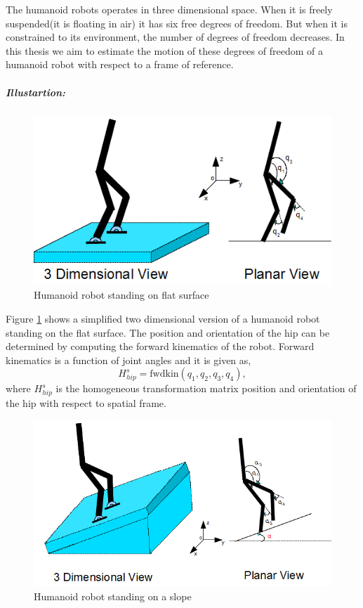    The humanoid robots operates in three dimensional space. When it is freely suspended(it is floating in air) it has six free degrees of freedom. But when it is constrained to its environment, the number of degrees of freedom decreases. In this thesis we aim to estimate the motion of these degrees of freedom of a humanoid robot with respect to a frame of reference.   
\subparagraph{Illustartion:}    
     \begin{figure}[h]
	    \centering
    	\includegraphics[scale=0.75]{Bilder/robot_flatfloor}
	    \caption{Humanoid robot standing on flat surface}	
	    \label{fig:flat_floor}
    \end{figure}
   Figure \ref{fig:flat_floor} shows a simplified two dimensional version of a humanoid robot standing on the flat surface. The position and orientation of the hip can be determined by computing the forward kinematics of the robot. Forward kinematics is a function of joint angles and it is given as,
    \begin{equation}
    \label{eq:fwkin_flat}
    H_{hip}^s = \text{fwdkin}(q_1,q_2,q_3,q_4),
    \end{equation}
    where $H_{hip}^s$ is the homogeneous transformation matrix position and orientation of the hip with respect to spatial frame. 
    \begin{figure}[h]
	    \centering
    	\includegraphics[scale=0.65]{Bilder/robot_slope}
	    \caption{Humanoid robot standing on a slope}	
	    \label{fig:slope}
    \end{figure}
